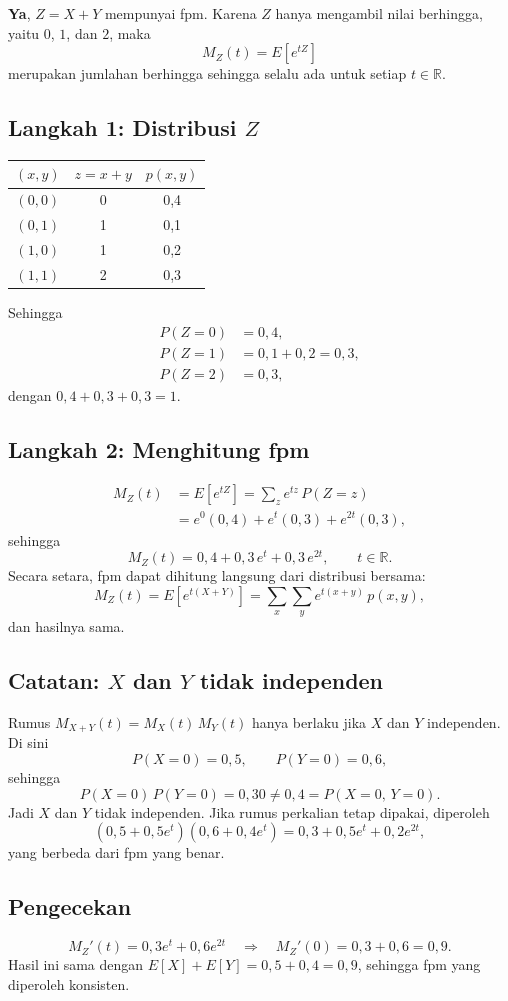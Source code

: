\documentclass[12pt,a4paper]{article}
\begin{document}
\textbf{Ya}, $Z = X + Y$ mempunyai fpm. Karena $Z$ hanya mengambil nilai berhingga, yaitu $0$, $1$, dan $2$, maka
\[
M_Z(t) = E\!\left[e^{tZ}\right]
\]
merupakan jumlahan berhingga sehingga selalu ada untuk setiap $t \in \mathbb{R}$.

\subsection*{Langkah 1: Distribusi $Z$}
\begin{center}
\begin{tabular}{ccc}
\toprule
$(x,y)$ & $z = x+y$ & $p(x,y)$ \\
\midrule
$(0,0)$ & 0 & 0{,}4 \\
$(0,1)$ & 1 & 0{,}1 \\
$(1,0)$ & 1 & 0{,}2 \\
$(1,1)$ & 2 & 0{,}3 \\
\bottomrule
\end{tabular}
\end{center}
Sehingga
\begin{align*}
P(Z=0) &= 0{,}4, \\
P(Z=1) &= 0{,}1 + 0{,}2 = 0{,}3, \\
P(Z=2) &= 0{,}3,
\end{align*}
dengan $0{,}4 + 0{,}3 + 0{,}3 = 1$.

\subsection*{Langkah 2: Menghitung fpm}
\begin{align*}
M_Z(t) &= E\!\left[e^{tZ}\right] = \sum_{z} e^{tz}\, P(Z=z) \\
&= e^{0}(0{,}4) + e^{t}(0{,}3) + e^{2t}(0{,}3),
\end{align*}
sehingga
\[
\boxed{M_Z(t) = 0{,}4 + 0{,}3\,e^{t} + 0{,}3\,e^{2t}, \qquad t \in \mathbb{R}.}
\]
Secara setara, fpm dapat dihitung langsung dari distribusi bersama:
\[
M_Z(t) = E\!\left[e^{t(X+Y)}\right] = \sum_{x}\sum_{y} e^{t(x+y)}\, p(x,y),
\]
dan hasilnya sama.

\subsection*{Catatan: $X$ dan $Y$ tidak independen}
Rumus $M_{X+Y}(t) = M_X(t)\,M_Y(t)$ hanya berlaku jika $X$ dan $Y$ independen. Di sini
\[
P(X=0) = 0{,}5, \qquad P(Y=0) = 0{,}6,
\]
sehingga
\[
P(X=0)\,P(Y=0) = 0{,}30 \neq 0{,}4 = P(X=0,\,Y=0).
\]
Jadi $X$ dan $Y$ tidak independen. Jika rumus perkalian tetap dipakai, diperoleh
\[
(0{,}5 + 0{,}5e^{t})(0{,}6 + 0{,}4e^{t}) = 0{,}3 + 0{,}5e^{t} + 0{,}2e^{2t},
\]
yang berbeda dari fpm yang benar.

\subsection*{Pengecekan}
\[
M_Z'(t) = 0{,}3e^{t} + 0{,}6e^{2t}
\quad\Longrightarrow\quad
M_Z'(0) = 0{,}3 + 0{,}6 = 0{,}9.
\]
Hasil ini sama dengan $E[X] + E[Y] = 0{,}5 + 0{,}4 = 0{,}9$, sehingga fpm yang diperoleh konsisten.
\end{document}
